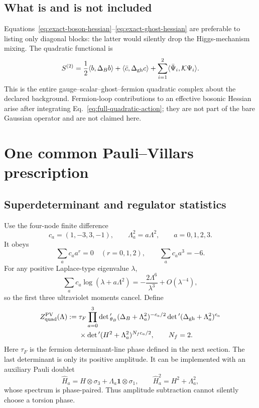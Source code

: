 \documentclass[11pt]{article}
\theoremstyle{definition}
\theoremstyle{remark}
\begin{document}
\subsection{What is and is not included}

Equations~\eqref{eq:exact-boson-hessian}--\eqref{eq:exact-ghost-hessian}
are preferable to listing only diagonal blocks: the latter would silently
drop the Higgs-mechanism mixing.  The quadratic functional is
\begin{equation}
 S^{(2)}=\frac12\langle b,\Delta_Bb\rangle
 +\langle\bar c,\Delta_{\rm gh}c\rangle
 +\sum_{i=1}^2\langle\bar\Psi_i,\mathcal K\Psi_i\rangle.
 \label{eq:full-quadratic-action}
\end{equation}
This is the entire gauge--scalar--ghost--fermion quadratic complex about the
declared background.  Fermion-loop contributions to an effective bosonic
Hessian arise after integrating Eq.~\eqref{eq:full-quadratic-action}; they
are not part of the bare Gaussian operator and are not claimed here.

\section{One common Pauli--Villars prescription}

\subsection{Superdeterminant and regulator statistics}

Use the four-node finite difference
\begin{equation}
 c_a=(1,-3,3,-1),\qquad \Lambda_a^2=a\Lambda^2,\qquad a=0,1,2,3.
 \label{eq:pv-data}
\end{equation}
It obeys
\begin{equation}
 \sum_ac_a a^r=0\quad(r=0,1,2),
 \qquad
 \sum_ac_aa^3=-6.
 \label{eq:pv-moments}
\end{equation}
For any positive Laplace-type eigenvalue \(\lambda\),
\begin{equation}
 \sum_ac_a\log(\lambda+a\Lambda^2)
 =-\frac{2\Lambda^6}{\lambda^3}+O(\lambda^{-4}),
 \label{eq:pv-asymptotic}
\end{equation}
so the first three ultraviolet moments cancel.  Define
\begin{align}
 Z_{\rm quad}^{\rm PV}(\Lambda)
 :={}&\tau_F
 \prod_{a=0}^3
 \det{}'_{\theta_B}(\Delta_B+\Lambda_a^2)^{-c_a/2}
 \det{}'(\Delta_{\rm gh}+\Lambda_a^2)^{c_a}
 \notag\\
 &\times
 \det{}'(H^2+\Lambda_a^2)^{N_f c_a/2},
 \qquad N_f=2.
 \label{eq:common-pv}
\end{align}
Here \(\tau_F\) is the fermion determinant-line phase defined in the next
section.  The last determinant is only its positive amplitude.  It can be
implemented with an auxiliary Pauli doublet
\begin{equation}
 \widehat H_a=H\otimes\sigma_3+\Lambda_a\bm1\otimes\sigma_1,
 \qquad \widehat H_a^2=H^2+\Lambda_a^2,
 \label{eq:pv-doublet}
\end{equation}
whose spectrum is phase-paired.  Thus amplitude subtraction cannot
silently choose a torsion phase.
\end{document}
